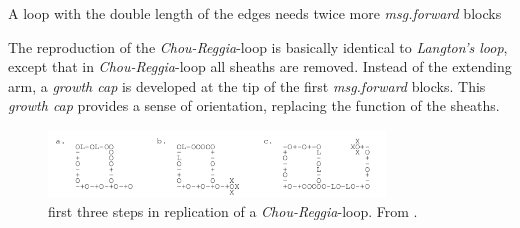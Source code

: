 \documentclass[10pt,a4paper,boxed]{hmcpset}
\begin{document}
\begin{problem}[Assignment 24]
\end{problem}
\begin{solution}
    A loop with the double length of the edges needs twice more \emph{msg.forward} blocks
\end{solution}

\begin{problem}[Assignment 25]
\end{problem}
\begin{solution}
The reproduction of the \emph{Chou-Reggia}-loop is basically identical to \emph{Langton's loop}, except that in \emph{Chou-Reggia}-loop all sheaths are removed. Instead of the extending arm, a \emph{growth cap} is developed at the tip of the first \emph{msg.forward} blocks. This \emph{growth cap} provides a sense of orientation, replacing the function of the sheaths.

\begin{figure}[h!]
	\centering
	\includegraphics[width=0.8\textwidth]{img/choureggia}
	\caption{first three steps in replication of a \emph{Chou-Reggia}-loop. From \cite{ChouReggia}. }
\end{figure}
\end{solution}

\end{document}
